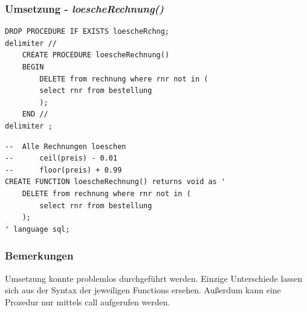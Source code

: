 \subsubsection{Umsetzung - \textit{loescheRechnung()}}
\vspace{0.3cm}
\begin{minipage}{.5\textwidth}
	\begin{lstlisting}[style=sql1, caption={loescheRchng() - MySQL}]
DROP PROCEDURE IF EXISTS loescheRchng;
delimiter //
	CREATE PROCEDURE loescheRechnung() 
	BEGIN
		DELETE from rechnung where rnr not in (
		select rnr from bestellung
		);
	END //
delimiter ;
	\end{lstlisting}
\end{minipage}%
\begin{minipage}{.5\textwidth}
	\begin{lstlisting}[style=sql, caption={loescheRchng() - PSQL}]
--	Alle Rechnungen loeschen
--		ceil(preis) - 0.01
--		floor(preis) + 0.99
CREATE FUNCTION loescheRechnung() returns void as '
	DELETE from rechnung where rnr not in (
		select rnr from bestellung
	);
' language sql;
	\end{lstlisting}
\end{minipage}

\subsubsection{Bemerkungen}
Umsetzung konnte problemlos durchgeführt werden. Einzige Unterschiede lassen sich aus der Syntax der jeweiligen Functions ersehen. Außerdum kann eine Prozedur nur mittels call aufgerufen werden.

